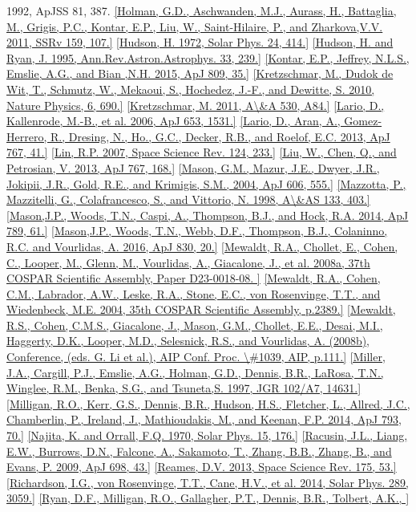 \documentclass[10pt,preprint]{aastex}  %
\begin{document}
\begin{references}
{	1992, ApJSS 81, 387.}
\ref{Holman, G.D., Aschwanden, M.J., Aurass, H., Battaglia, M., 
	Grigis, P.C., Kontar, E.P., Liu, W., Saint-Hilaire, P., 
	and Zharkova,V.V. 2011, SSRv 159, 107.}
\ref{Hudson, H. 1972, Solar Phys. 24, 414.}
\ref{Hudson, H. and Ryan, J. 1995, Ann.Rev.Astron.Astrophys. 33, 239.}
\ref{Kontar, E.P., Jeffrey, N.L.S., Emslie, A.G., and Bian ,N.H. 2015, ApJ 809, 35.}
\ref{Kretzschmar, M., Dudok de Wit, T., Schmutz, W., Mekaoui, S., 
	Hochedez, J.-F., and Dewitte, S. 2010, Nature Physics, 6, 690.}
\ref{Kretzschmar, M. 2011, A\&A 530, A84.}
\ref{Lario, D., Kallenrode, M.-B., et al. 2006, ApJ 653, 1531.}
\ref{Lario, D., Aran, A., Gomez-Herrero, R., Dresing, N., Ho., G.C., 
	Decker, R.B., and Roelof, E.C. 2013, ApJ 767, 41.}
\ref{Lin, R.P. 2007, Space Science Rev. 124, 233.}
\ref{Liu, W., Chen, Q., and Petrosian, V. 2013, ApJ 767, 168.}
\ref{Mason, G.M., Mazur, J.E., Dwyer, J.R., Jokipii, J.R., Gold, R.E., 
	and Krimigis, S.M., 2004, ApJ 606, 555.}
\ref{Mazzotta, P., Mazzitelli, G., Colafrancesco, S., and Vittorio, N.
	1998, A\&AS 133, 403.}
\ref{Mason,J.P., Woods, T.N., Caspi, A., Thompson, B.J., and Hock, R.A.
 	2014, ApJ 789, 61.}
\ref{Mason,J.P., Woods, T.N., Webb, D.F., Thompson, B.J., Colaninno, R.C. 
	and Vourlidas, A.  2016, ApJ 830, 20.}
\ref{Mewaldt, R.A., Chollet, E., Cohen, C., Looper, M., Glenn, M.,
	Vourlidas, A., Giacalone, J., et al. 2008a, 37th COSPAR Scientific
	Assembly, Paper D23-0018-08. }
\ref{Mewaldt, R.A., Cohen, C.M., Labrador, A.W., Leske, R.A., Stone, E.C.,
	von Rosenvinge, T.T., and Wiedenbeck, M.E. 2004, 35th
	COSPAR Scientific Assembly, p.2389.}
\ref{Mewaldt, R.S., Cohen, C.M.S., Giacalone, J., Mason, G.M., 
	Chollet, E.E.,  Desai, M.I., Haggerty, D.K., Looper, M.D.,
	Selesnick, R.S., and Vourlidas, A. (2008b), 
	Conference, (eds. G. Li et al.), AIP Conf. Proc. \#1039, AIP, p.111.}
\ref{Miller, J.A., Cargill, P.J., Emslie, A.G., Holman, G.D., 
	Dennis, B.R., LaRosa, T.N., Winglee, R.M., Benka, S.G., and Tsuneta,S.
 	1997, JGR 102/A7, 14631.}
\ref{Milligan, R.O., Kerr, G.S., Dennis, B.R., Hudson, H.S., Fletcher, L.,
	Allred, J.C., Chamberlin, P., Ireland, J., Mathioudakis, M.,
	and Keenan, F.P. 2014, ApJ 793, 70.}
\ref{Najita, K. and Orrall, F.Q. 1970, Solar Phys. 15, 176.}
\ref{Racusin, J.L., Liang, E.W., Burrows, D.N., Falcone, A., Sakamoto, T.,
	Zhang, B.B., Zhang, B., and Evans, P. 2009, ApJ 698, 43.} 
\ref{Reames, D.V. 2013, Space Science Rev. 175, 53.}
\ref{Richardson, I.G., von Rosenvinge, T.T., Cane, H.V., et al.
	 2014, Solar Phys. 289, 3059.} 
\ref{Ryan, D.F., Milligan, R.O., Gallagher, P.T., Dennis, B.R., Tolbert, A.K., 
}
\end{references}
\end{document}
